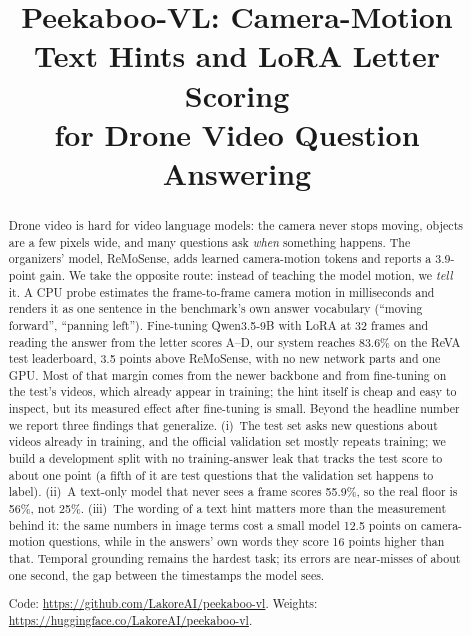 \documentclass[conference]{IEEEtran}
\begin{document}
\title{Peekaboo-VL: Camera-Motion Text Hints and LoRA Letter Scoring\\for Drone Video Question Answering}

\author{
}

\maketitle

\begin{abstract}
Drone video is hard for video language models: the camera never stops
moving, objects are a few pixels wide, and many questions ask \emph{when}
something happens. The organizers' model, ReMoSense, adds learned
camera-motion tokens and reports a 3.9-point gain. We take the opposite
route: instead of teaching the model motion, we \emph{tell} it. A CPU probe
estimates the frame-to-frame camera motion in milliseconds and renders it
as one sentence in the benchmark's own answer vocabulary (``moving
forward'', ``panning left''). Fine-tuning Qwen3.5-9B with LoRA at 32
frames and reading the answer from the letter scores A--D, our system
reaches 83.6\% on the ReVA test leaderboard, 3.5 points above ReMoSense,
with no new network parts and one GPU. Most of that margin comes from the
newer backbone and from fine-tuning on the test's videos, which already
appear in training; the hint itself is cheap and easy to inspect, but its
measured effect after fine-tuning is small. Beyond the headline number we
report three findings that generalize. (i)~The test set asks new questions
about videos already in training, and the official validation set mostly
repeats training; we build a development split with no training-answer
leak that tracks the test score to about one point (a fifth of it are
test questions that the validation set happens to label). (ii)~A
text-only model that never sees a frame scores 55.9\%, so the real floor
is 56\%, not 25\%. (iii)~The wording of a text hint matters more than the
measurement behind it: the same numbers in image terms cost a small model
12.5 points on camera-motion questions, while in the answers' own words
they score 16 points higher than that.
Temporal grounding remains the hardest task; its errors are near-misses of
about one second, the gap between the timestamps the model sees.

Code: \url{https://github.com/LakoreAI/peekaboo-vl}.
Weights: \url{https://huggingface.co/LakoreAI/peekaboo-vl}.
\end{abstract}
\end{document}
